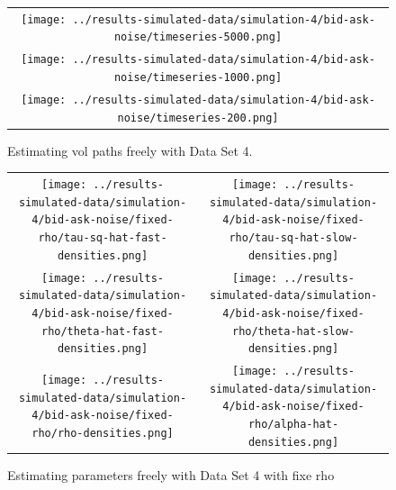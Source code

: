 \documentclass[10pt]{article}
\begin{document}
\begin{figure}
  \centering
  \begin{tabular}{c}
    \begin{minipage}{0.80\textwidth}
      \centering
      \texttt{[image: ../results-simulated-data/simulation-4/bid-ask-noise/timeseries-5000.png]}
    \end{minipage} \\
    \begin{minipage}{0.80\textwidth}
      \centering
      \texttt{[image: ../results-simulated-data/simulation-4/bid-ask-noise/timeseries-1000.png]}
    \end{minipage} \\
    \begin{minipage}{0.80\textwidth}
      \centering
      \texttt{[image: ../results-simulated-data/simulation-4/bid-ask-noise/timeseries-200.png]}
    \end{minipage}
  \end{tabular}
  \caption{Estimating vol paths freely with Data Set 4.}
\end{figure}

\begin{figure}
  \centering
  \begin{tabular}{cc}
    \begin{minipage}{0.45\textwidth}
      \centering
      \texttt{[image: ../results-simulated-data/simulation-4/bid-ask-noise/fixed-rho/tau-sq-hat-fast-densities.png]}
    \end{minipage}
    & \begin{minipage}{0.45\textwidth}
      \centering
      \texttt{[image: ../results-simulated-data/simulation-4/bid-ask-noise/fixed-rho/tau-sq-hat-slow-densities.png]}
      \end{minipage} \\
    \begin{minipage}{0.45\textwidth}
      \centering
      \texttt{[image: ../results-simulated-data/simulation-4/bid-ask-noise/fixed-rho/theta-hat-fast-densities.png]}
    \end{minipage}
    & \begin{minipage}{0.45\textwidth}
      \centering
      \texttt{[image: ../results-simulated-data/simulation-4/bid-ask-noise/fixed-rho/theta-hat-slow-densities.png]}
    \end{minipage} \\
    \begin{minipage}{0.45\textwidth}
      \centering
      \texttt{[image: ../results-simulated-data/simulation-4/bid-ask-noise/fixed-rho/rho-densities.png]}
    \end{minipage}
    & \begin{minipage}{0.45\textwidth}
      \centering
      \texttt{[image: ../results-simulated-data/simulation-4/bid-ask-noise/fixed-rho/alpha-hat-densities.png]}
    \end{minipage}
  \end{tabular}
  \caption{Estimating parameters freely with Data Set 4 with fixe rho}
\end{figure}
\end{document}
